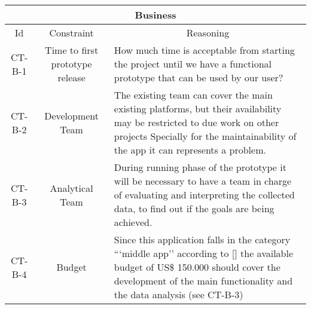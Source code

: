 \begin{table}[H]
    \begin{tabularx}{\textwidth}{|c|c|X|}
        \hline
        \multicolumn{3}{c}{\textbf{Business}} \\
        \hline
        \toprule
        \multicolumn{1}{c}{Id} & \multicolumn{1}{c}{Constraint} & \multicolumn{1}{c}{Reasoning} \\
        \midrule
        CT-B-1 & Time to first prototype release & How much time is acceptable from starting the project
        until we have a functional prototype that can be used by our user? \\
        CT-B-2 & Development Team & The existing team can cover the main existing platforms, but their availability
        may be restricted to due work on other projects Specially for the maintainability of the app it can represents
        a problem. \\
        CT-B-3 & Analytical Team & During running phase of the prototype it will be necessary to have a team in charge
        of evaluating and interpreting the collected data, to find out if the goals are being achieved. \\
        CT-B-4 & Budget & Since this application falls in the category ```middle app'' according to [\cite{refonline:SPDLOAD}]
        the available budget of US\$ 150.000 should cover the development of the main functionality and the data analysis 
        (see CT-B-3) \\
        \bottomrule
    \end{tabularx}
\end{table}












